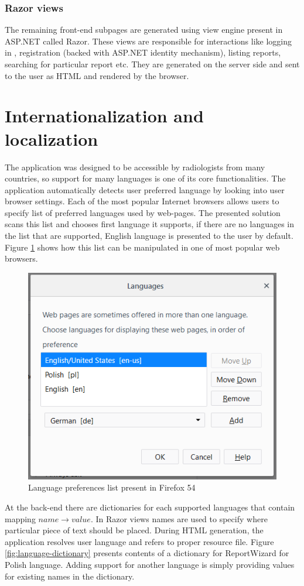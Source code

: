 \documentclass[12pt, twoside, openany]{report}
\theoremstyle{definition}
\begin{document}
\subsubsection{Razor views}
The remaining front-end subpages are generated using view engine present in ASP.NET called Razor. These views are responsible for interactions like logging in , registration (backed with ASP.NET identity mechanism), listing reports, searching for particular report etc. They are generated on the server side and sent to the user as HTML and rendered by the browser.
 


\section{Internationalization and localization}
The application was designed to be accessible by radiologists from many countries, so support for many languages is one of its core functionalities. The application automatically detects user preferred language by looking into user browser settings. Each of the most popular Internet browsers allows users to specify list of preferred languages used by web-pages. The presented solution scans this list and chooses first language it supports, if there are no languages in the list that are supported, English language is presented to the user by default. Figure \ref{fig:language-preferences} shows how this list can be manipulated in one of most popular web browsers.
\begin{figure}
    \centering
    \includegraphics[width=0.6\linewidth]{language-preferences}
    \caption{Language preferences list present in Firefox 54\label{fig:language-preferences}}
\end{figure}

At the back-end there are dictionaries for each supported languages that contain mapping $name \to value$. 
In Razor views names are used to specify where particular piece of text should be placed. During HTML generation, the application resolves user language and refers to proper resource file. Figure \ref{fig:language-dictionary} presents contents of a dictionary for ReportWizard for Polish language. Adding support for another language is simply providing values for existing names in the dictionary.
\end{document}
